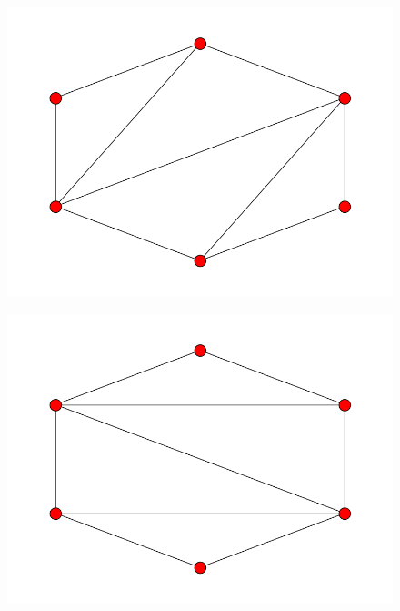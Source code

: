 \documentclass[fontsize=10pt]{article}
\begin{document}
\begin{figure}[hbtp]
\centering
\includegraphics[scale=0.5]{imgs/hexagon/hexagon_10.png}
\end{figure}

\begin{figure}[hbtp]
\centering
\includegraphics[scale=0.5]{imgs/hexagon/hexagon_11.png}
\end{figure}
\end{document}
